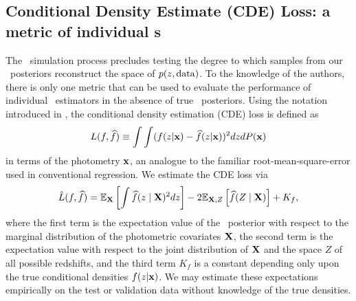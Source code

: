 
\subsection{Conditional Density Estimate (CDE) Loss: a metric of individual \pzpdf s}

The \buzz\ simulation process precludes testing the degree to which samples from our \pz\ posteriors reconstruct the space of $p(z, {\rm data})$.
To the knowledge of the authors, there is only one metric that can be used to evaluate the performance of individual \pzpdf\ estimators in the absence of true \pz\ posteriors.
Using the notation introduced in , the conditional density estimation (CDE) loss is defined as
\begin{equation}
\eqlabel{eq:cde-loss}
L(f, \widehat{f}) \equiv \int \int (f(z \vert \x) - \widehat{f}(z \vert \x))^{2} dz dP(\x)
\end{equation}
in terms of the photometry ${\mathbf{x}}$, an analogue to the familiar root-mean-square-error used in conventional regression.
We estimate the CDE loss via
\begin{equation}
\eqlabel{eq:estimated-cde-loss}
\hat{L}(f, \widehat{f}) = \mathbb{E}_\X \left[\int \widehat{f}(z \mid \X)^{2} dz\right] - 2 \mathbb{E}_{\X, Z}\left[\widehat{f}(Z \mid \X)\right] + K_{f},
\end{equation}
where the first term is the expectation value of the \pz\ posterior with respect to the marginal distribution of the photometric covariates ${\mathbf{X}}$, the second term is the expectation value with respect to the joint distribution of ${\mathbf{X}}$ and the space $Z$ of all possible redshifts, and the third term $K_{f}$ is a constant depending only upon the true conditional densities $f(z \vert {\mathbf{x}})$.
We may estimate these expectations empirically on the test or validation data \citep[Eq.~7 in][]{Izbicki:17b} without knowledge of the true densities.

